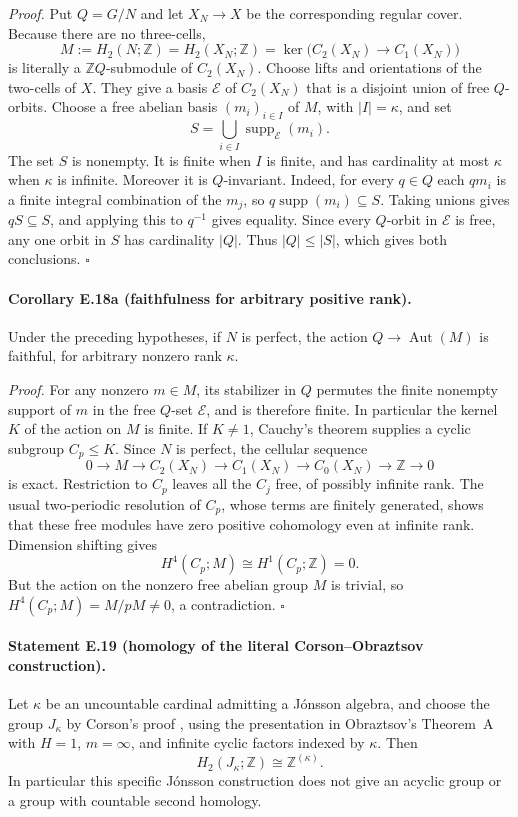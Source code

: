 \emph{Proof.}
Put $Q=G/N$ and let $X_N\to X$ be the corresponding regular
cover. Because there are no three-cells,
\[
 M:=H_2(N;\mathbb Z)=H_2(X_N;\mathbb Z)
       =\ker\bigl(C_2(X_N)\to C_1(X_N)\bigr)
\]
is literally a $\mathbb ZQ$-submodule of $C_2(X_N)$.
Choose lifts and orientations of the two-cells of $X$.
They give a basis $\mathcal E$ of $C_2(X_N)$ that is a
disjoint union of free $Q$-orbits. Choose a free abelian
basis $(m_i)_{i\in I}$ of $M$, with $|I|=\kappa$, and set
\[
                  S=\bigcup_{i\in I}\operatorname{supp}_{\mathcal E}(m_i).
\]
The set $S$ is nonempty. It is finite when $I$ is finite,
and has cardinality at most $\kappa$ when $\kappa$ is
infinite. Moreover it is $Q$-invariant. Indeed, for every
$q\in Q$ each $qm_i$ is a finite integral combination of
the $m_j$, so $q\operatorname{supp}(m_i)\subseteq S$.
Taking unions gives $qS\subseteq S$, and applying this to
$q^{-1}$ gives equality. Since every $Q$-orbit in
$\mathcal E$ is free, any one orbit in $S$ has cardinality
$|Q|$. Thus $|Q|\leq|S|$, which gives both conclusions.
\hfill$\square$

\paragraph{Corollary E.18a (faithfulness for arbitrary positive rank).}
Under the preceding hypotheses, if $N$ is perfect, the
action $Q\to\operatorname{Aut}(M)$ is faithful, for
arbitrary nonzero rank $\kappa$.

\emph{Proof.}
For any nonzero $m\in M$, its stabilizer in $Q$ permutes
the finite nonempty support of $m$ in the free $Q$-set
$\mathcal E$, and is therefore finite. In particular the
kernel $K$ of the action on $M$ is finite. If $K\ne1$,
Cauchy's theorem supplies a cyclic subgroup $C_p\leq K$.
Since $N$ is perfect, the cellular sequence
\[
 0\longrightarrow M\longrightarrow C_2(X_N)
  \longrightarrow C_1(X_N)\longrightarrow C_0(X_N)
  \longrightarrow\mathbb Z\longrightarrow0
\]
is exact. Restriction to $C_p$ leaves all the $C_j$ free,
of possibly infinite rank. The usual two-periodic
resolution of $C_p$, whose terms are finitely generated,
shows that these free modules have zero positive
cohomology even at infinite rank. Dimension shifting gives
\[
 H^4(C_p;M)\cong H^1(C_p;\mathbb Z)=0.
\]
But the action on the nonzero free abelian group $M$ is
trivial, so $H^4(C_p;M)=M/pM\ne0$, a contradiction.
\hfill$\square$

\paragraph{Statement E.19 (homology of the literal Corson--Obraztsov construction).}
Let $\kappa$ be an uncountable cardinal admitting a J\'onsson algebra,
and choose the group $J_\kappa$ by Corson's proof
\cite[Proposition~5 and proof of Theorem~1]{ECorson2022Jonsson},
using the presentation in Obraztsov's Theorem~A
\cite[pp.~268--269, 276--278]{EObraztsov1996Scheme} with $H=1$, $m=\infty$, and infinite cyclic
factors indexed by $\kappa$. Then
\[
                 H_2(J_\kappa;\mathbb Z)\cong\mathbb Z^{(\kappa)}.
\]
In particular this specific J\'onsson construction does not give an
acyclic group or a group with countable second homology.

